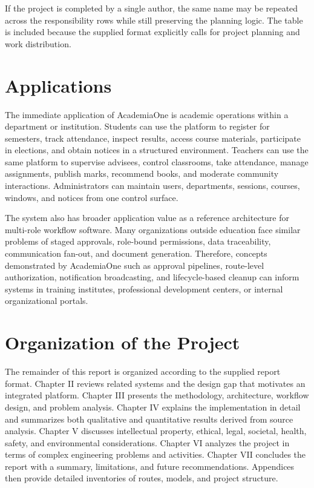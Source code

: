 \documentclass[12pt,a4paper]{report}
\newcommand{\systemName}{AcademiaOne}
\begin{document}
If the project is completed by a single author, the same name may be repeated across the responsibility rows while still preserving the planning logic. The table is included because the supplied format explicitly calls for project planning and work distribution.

\section{Applications}
The immediate application of \systemName{} is academic operations within a department or institution. Students can use the platform to register for semesters, track attendance, inspect results, access course materials, participate in elections, and obtain notices in a structured environment. Teachers can use the same platform to supervise advisees, control classrooms, take attendance, manage assignments, publish marks, recommend books, and moderate community interactions. Administrators can maintain users, departments, sessions, courses, windows, and notices from one control surface.

The system also has broader application value as a reference architecture for multi-role workflow software. Many organizations outside education face similar problems of staged approvals, role-bound permissions, data traceability, communication fan-out, and document generation. Therefore, concepts demonstrated by \systemName{} such as approval pipelines, route-level authorization, notification broadcasting, and lifecycle-based cleanup can inform systems in training institutes, professional development centers, or internal organizational portals.

\section{Organization of the Project}
The remainder of this report is organized according to the supplied report format. Chapter II reviews related systems and the design gap that motivates an integrated platform. Chapter III presents the methodology, architecture, workflow design, and problem analysis. Chapter IV explains the implementation in detail and summarizes both qualitative and quantitative results derived from source analysis. Chapter V discusses intellectual property, ethical, legal, societal, health, safety, and environmental considerations. Chapter VI analyzes the project in terms of complex engineering problems and activities. Chapter VII concludes the report with a summary, limitations, and future recommendations. Appendices then provide detailed inventories of routes, models, and project structure.
\end{document}
